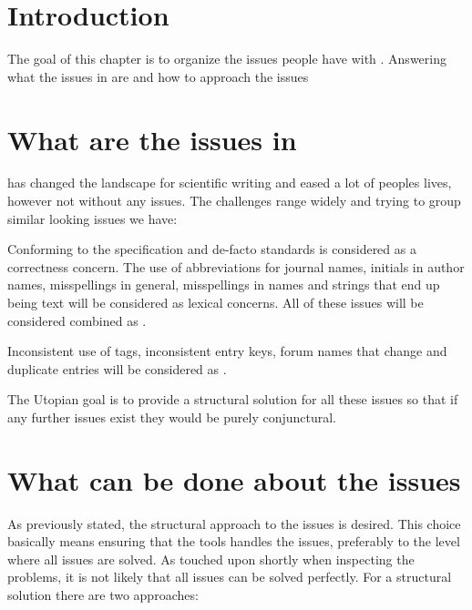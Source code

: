 \section{Introduction}
The goal of this chapter is to organize the issues people have with
{\bibtex}.  Answering what the issues in {\bibtex} are
 and how to approach the {\bibtex}
issues 

\section{What are the issues in {\bibtex}}
\label{sec:intro_what_issues}

{\bibtex} has changed the landscape for scientific writing and eased a
lot of peoples lives, however not without any issues.  The challenges
range widely and trying to group similar looking issues we have:


Conforming to the specification and de-facto standards is considered
as a correctness concern.  The use of abbreviations for journal names,
initials in author names, misspellings in general, misspellings in
names and {\bibtex} strings that end up being text will be considered
as lexical concerns.  All of these issues will be considered combined
as .

Inconsistent use of tags, inconsistent entry keys, forum names that
change and duplicate entries will be considered as .

The Utopian goal is to provide a structural solution for all these
issues so that if any further issues exist they would be purely
conjunctural.


\section{What can be done about the {\bibtex} issues}
\label{sec:intro_what_to_do}

As previously stated, the structural approach to the issues is desired.
This choice basically means ensuring that the tools handles the
issues, preferably to the level where all issues are solved.  As
touched upon shortly when inspecting the problems, it is not likely
that all issues can be solved perfectly.  For a structural solution
there are two approaches:


